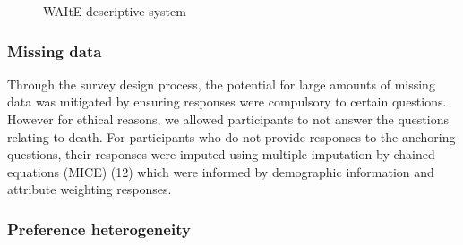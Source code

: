 \documentclass[
  letterpaper,
  DIV=11,
  numbers=noendperiod]{scrartcl}
\begin{document}
\begin{figure}


\caption{\label{fig-waite-descriptive}WAItE descriptive system}

\end{figure}%

\subsubsection{Missing data}\label{missing-data}

Through the survey design process, the potential for large amounts of
missing data was mitigated by ensuring responses were compulsory to
certain questions. However for ethical reasons, we allowed participants
to not answer the questions relating to death. For participants who do
not provide responses to the anchoring questions, their responses were
imputed using multiple imputation by chained equations (MICE) (12) which
were informed by demographic information and attribute weighting
responses.

\subsubsection{Preference
heterogeneity}\label{sec-opuf-preference-heterogeneity}
\end{document}
